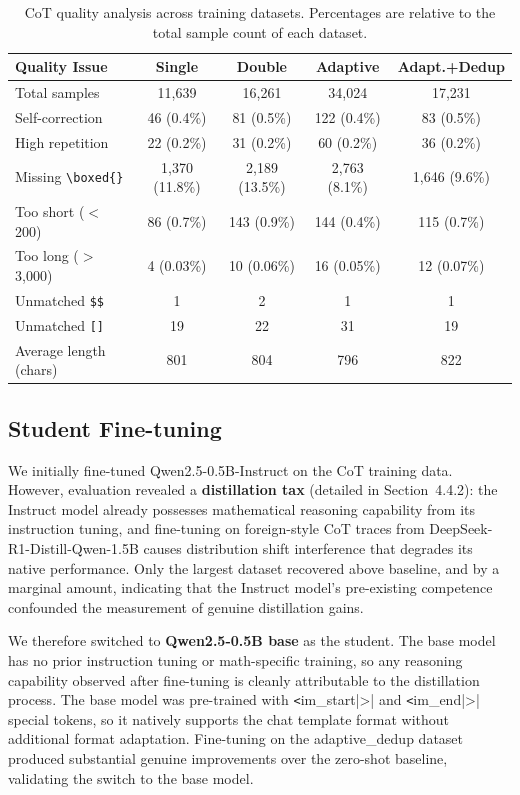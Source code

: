 \documentclass{article}
\begin{document}
\begin{table}[H]
\centering
\caption{CoT quality analysis across training datasets. Percentages are relative to the total sample count of each dataset.}
\label{tab:cot_quality}
\begin{tabular}{lcccc}
\toprule
\textbf{Quality Issue} & \textbf{Single} & \textbf{Double} & \textbf{Adaptive} & \textbf{Adapt.+Dedup} \\
\midrule
Total samples          & 11,639 & 16,261 & 34,024 & 17,231 \\
\midrule
Self-correction        & 46 (0.4\%) & 81 (0.5\%) & 122 (0.4\%) & 83 (0.5\%) \\
High repetition        & 22 (0.2\%) & 31 (0.2\%) & 60 (0.2\%) & 36 (0.2\%) \\
Missing \texttt{\textbackslash{}boxed\{\}} & 1,370 (11.8\%) & 2,189 (13.5\%) & 2,763 (8.1\%) & 1,646 (9.6\%) \\
Too short ($<$200)     & 86 (0.7\%) & 143 (0.9\%) & 144 (0.4\%) & 115 (0.7\%) \\
Too long ($>$3,000)    & 4 (0.03\%) & 10 (0.06\%) & 16 (0.05\%) & 12 (0.07\%) \\
Unmatched \texttt{\$\$}& 1 & 2 & 1 & 1 \\
Unmatched \texttt{[]}  & 19 & 22 & 31 & 19 \\
\midrule
Average length (chars) & 801 & 804 & 796 & 822 \\
\bottomrule
\end{tabular}
\end{table}

\subsection{Student Fine-tuning}

We initially fine-tuned Qwen2.5-0.5B-Instruct on the CoT training data. However, evaluation revealed a \textbf{distillation tax} (detailed in Section~4.4.2): the Instruct model already possesses mathematical reasoning capability from its instruction tuning, and fine-tuning on foreign-style CoT traces from DeepSeek-R1-Distill-Qwen-1.5B causes distribution shift interference that degrades its native performance. Only the largest dataset recovered above baseline, and by a marginal amount, indicating that the Instruct model's pre-existing competence confounded the measurement of genuine distillation gains.

We therefore switched to \textbf{Qwen2.5-0.5B base} as the student. The base model has no prior instruction tuning or math-specific training, so any reasoning capability observed after fine-tuning is cleanly attributable to the distillation process. The base model was pre-trained with \verb|<|im\_start|>| and \verb|<|im\_end|>| special tokens, so it natively supports the chat template format without additional format adaptation. Fine-tuning on the adaptive\_dedup dataset produced substantial genuine improvements over the zero-shot baseline, validating the switch to the base model.
\end{document}
